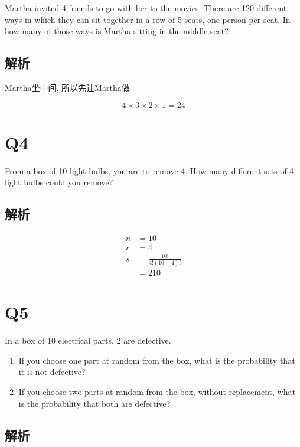   Martha invited 4 friends to go with her to the movies. There are 120
  different ways in which they can sit together in a row of 5 seats,
  one person per seat. In how many of those ways is Martha sitting in the
  middle seat?

  \subsection{解析}

    Martha坐中间, 所以先让Martha做

    \begin{equation*}
      4 \times 3 \times 2 \times 1 = 24
    \end{equation*}

\section{Q4}

  From a box of 10 light bulbs, you are to remove 4. How many different sets
  of 4 light bulbs could you remove?

  \subsection{解析}

    \begin{align*}
      n &= 10 \\
      r &= 4 \\
      s &= \frac{10!}{4!\left( 10 - 4 \right)!} \\
      &= 210
    \end{align*}

\section{Q5}

  In a box of 10 electrical parts, 2 are defective.

  \begin{enumerate}
    \item If you choose one part at random from the box, what is the
    probability that it is not defective?
    \item If you choose two parts at random from the box, without replacement,
    what is the probability that both are defective?
  \end{enumerate}

  \subsection{解析}

